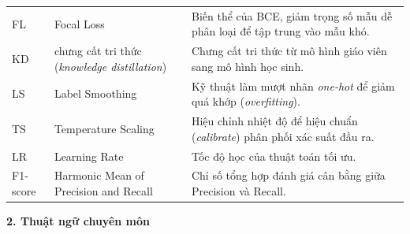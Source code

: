 {\begin{longtable}{L{2.6cm}L{4.8cm}L{6.3cm}}
FL & Focal Loss & Biến thể của BCE, giảm trọng số mẫu dễ phân loại để tập trung vào mẫu khó. \\
KD & chưng cất tri thức (\textit{knowledge distillation}) & Chưng cất tri thức từ mô hình giáo viên sang mô hình học sinh. \\
LS & Label Smoothing & Kỹ thuật làm mượt nhãn \textit{one-hot} để giảm quá khớp (\textit{overfitting}). \\
TS & Temperature Scaling & Hiệu chỉnh nhiệt độ để hiệu chuẩn (\textit{calibrate}) phân phối xác suất đầu ra. \\
LR & Learning Rate & Tốc độ học của thuật toán tối ưu. \\
F1-score & Harmonic Mean of Precision and Recall & Chỉ số tổng hợp đánh giá cân bằng giữa Precision và Recall. \\
\bottomrule
\end{longtable}
}

\noindent\textbf{2. Thuật ngữ chuyên môn}

